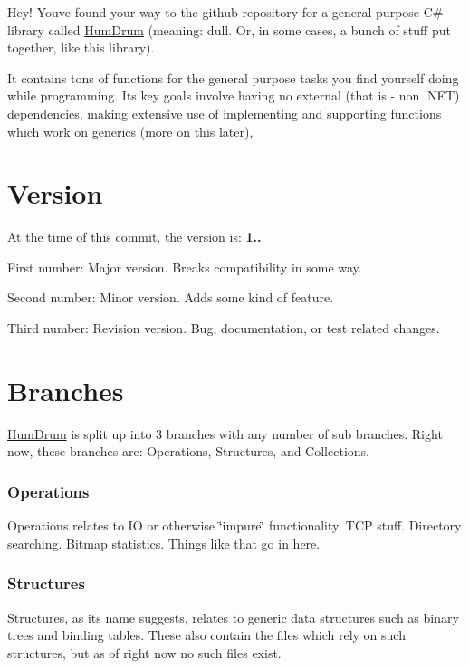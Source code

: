 Hey! You\textquotesingle{}ve found your way to the github repository for a general purpose C\# library called \hyperlink{namespaceHumDrum}{Hum\+Drum} (meaning\+: dull. Or, in some cases, a bunch of stuff put together, like this library).

It contains tons of functions for the general purpose tasks you find yourself doing while programming. Its key goals involve having no external (that is -\/ non .N\+E\+T) dependencies, making extensive use of implementing and supporting functions which work on generics (more on this later),

\section*{Version}

At the time of this commit, the version is\+: {\bfseries 1..}
\begin{DoxyItemize}
\item First number\+: Major version. Breaks compatibility in some way.
\item Second number\+: Minor version. Adds some kind of feature.
\item Third number\+: Revision version. Bug, documentation, or test related changes.
\end{DoxyItemize}

\section*{Branches}

\hyperlink{namespaceHumDrum}{Hum\+Drum} is split up into 3 branches with any number of sub branches. Right now, these branches are\+: Operations, Structures, and Collections.

\subsubsection*{Operations}

Operations relates to I\+O or otherwise \char`\"{}impure\char`\"{} functionality. T\+C\+P stuff. Directory searching. Bitmap statistics. Things like that go in here.

\subsubsection*{Structures}

Structures, as its name suggests, relates to generic data structures such as binary trees and binding tables. These also contain the files which rely on such structures, but as of right now no such files exist.

